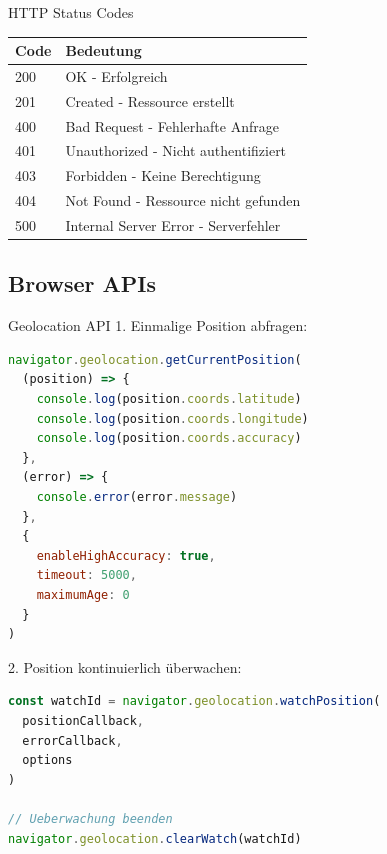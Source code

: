 \begin{corollary}{HTTP Status Codes}
    \begin{center}
    \begin{tabular}{|l|l|}
    \hline
    Code & Bedeutung \\
    \hline
    200 & OK - Erfolgreich \\
    \hline
    201 & Created - Ressource erstellt \\
    \hline
    400 & Bad Request - Fehlerhafte Anfrage \\
    \hline
    401 & Unauthorized - Nicht authentifiziert \\
    \hline
    403 & Forbidden - Keine Berechtigung \\
    \hline
    404 & Not Found - Ressource nicht gefunden \\
    \hline
    500 & Internal Server Error - Serverfehler \\
    \hline
    \end{tabular}
    \end{center}
\end{corollary}

\subsection{Browser APIs}

\begin{KR}{Geolocation API}
1. Einmalige Position abfragen:
\begin{lstlisting}[language=JavaScript, style=basesmol]
navigator.geolocation.getCurrentPosition(
  (position) => {
    console.log(position.coords.latitude)
    console.log(position.coords.longitude)
    console.log(position.coords.accuracy)
  },
  (error) => {
    console.error(error.message)
  },
  {
    enableHighAccuracy: true,
    timeout: 5000,
    maximumAge: 0
  }
)
\end{lstlisting}

2. Position kontinuierlich überwachen:
\begin{lstlisting}[language=JavaScript, style=basesmol]
const watchId = navigator.geolocation.watchPosition(
  positionCallback,
  errorCallback,
  options
)

// Ueberwachung beenden
navigator.geolocation.clearWatch(watchId)
\end{lstlisting}
\end{KR}

